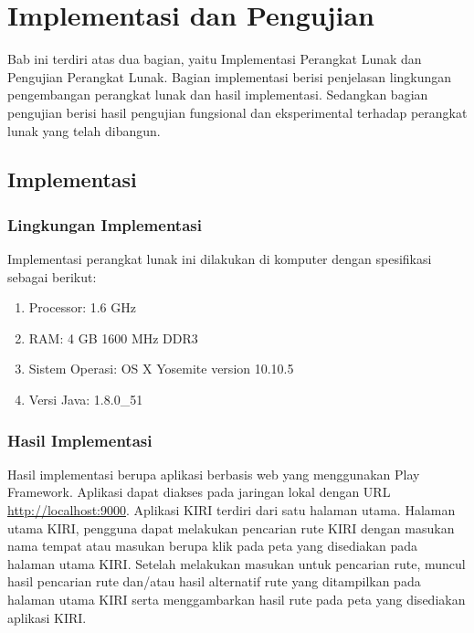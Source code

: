 \chapter{Implementasi dan Pengujian}
\label{chap:implementasiPengujian}

Bab ini terdiri atas dua bagian, yaitu Implementasi Perangkat Lunak dan Pengujian Perangkat Lunak. Bagian implementasi berisi penjelasan lingkungan pengembangan perangkat lunak dan hasil implementasi. Sedangkan bagian pengujian berisi hasil pengujian fungsional dan eksperimental terhadap perangkat lunak yang telah dibangun.

\section{Implementasi}
\label{sec:implementasi}

\subsection{Lingkungan Implementasi}
\label{sec:lingkungan_implementasi}
Implementasi perangkat lunak ini dilakukan di komputer dengan spesifikasi sebagai berikut:
\begin{enumerate}
	\item Processor: 1.6 GHz
	\item RAM: 4 GB 1600 MHz DDR3
	\item Sistem Operasi: OS X Yosemite version 10.10.5
	\item Versi Java: 1.8.0\_51
\end{enumerate}

\subsection{Hasil Implementasi}
Hasil implementasi berupa aplikasi berbasis web yang menggunakan Play Framework. Aplikasi dapat diakses pada jaringan lokal dengan URL \url{http://localhost:9000}. Aplikasi KIRI terdiri dari satu halaman utama. Halaman utama KIRI, pengguna dapat melakukan pencarian rute KIRI dengan masukan nama tempat atau masukan berupa klik pada peta yang disediakan pada halaman utama KIRI. Setelah melakukan masukan untuk pencarian rute, muncul hasil pencarian rute dan/atau hasil alternatif rute yang ditampilkan pada halaman utama KIRI serta menggambarkan hasil rute pada peta yang disediakan aplikasi KIRI.

